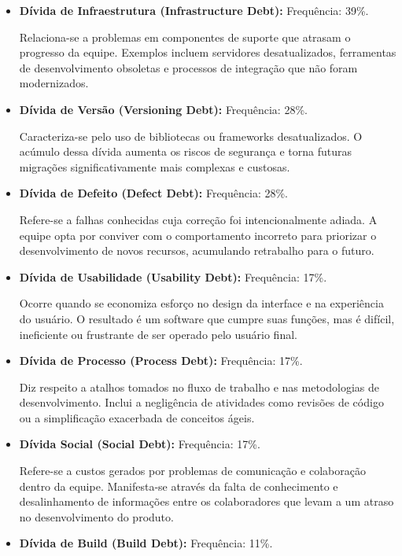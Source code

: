 \documentclass[12pt,openright,oneside,a4paper,brazil]{abntex2}
\begin{document}
\begin{itemize}
    \item \textbf{Dívida de Infraestrutura (Infrastructure Debt):} Frequência: 39\%.

    Relaciona-se a problemas em componentes de suporte que atrasam o progresso da equipe. Exemplos incluem servidores desatualizados, ferramentas de desenvolvimento obsoletas e processos de integração que não foram modernizados.

    \item \textbf{Dívida de Versão (Versioning Debt):} Frequência: 28\%.

    Caracteriza-se pelo uso de bibliotecas ou frameworks desatualizados. O acúmulo dessa dívida aumenta os riscos de segurança e torna futuras migrações significativamente mais complexas e custosas.

    \item \textbf{Dívida de Defeito (Defect Debt):} Frequência: 28\%.

    Refere-se a falhas conhecidas cuja correção foi intencionalmente adiada. A equipe opta por conviver com o comportamento incorreto para priorizar o desenvolvimento de novos recursos, acumulando retrabalho para o futuro.

    \item \textbf{Dívida de Usabilidade (Usability Debt):} Frequência: 17\%.

    Ocorre quando se economiza esforço no design da interface e na experiência do usuário. O resultado é um software que cumpre suas funções, mas é difícil, ineficiente ou frustrante de ser operado pelo usuário final.

    \item \textbf{Dívida de Processo (Process Debt):} Frequência: 17\%.

    Diz respeito a atalhos tomados no fluxo de trabalho e nas metodologias de desenvolvimento. Inclui a negligência de atividades como revisões de código ou a simplificação exacerbada de conceitos ágeis.

    \item \textbf{Dívida Social (Social Debt):} Frequência: 17\%.

    Refere-se a custos gerados por problemas de comunicação e colaboração dentro da equipe. Manifesta-se através da falta de conhecimento e desalinhamento de informações entre os colaboradores que levam a um atraso no desenvolvimento do produto.

    \item \textbf{Dívida de Build (Build Debt):} Frequência: 11\%.


\end{itemize}
\end{document}
